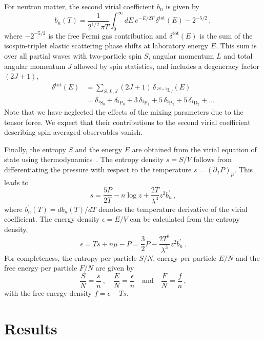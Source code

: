 \documentclass[aps,prc,twocolumn,showpacs,showkeys,amsmath,amssymb]{revtex4}
\newcommand{\be}{\begin{equation}}
\newcommand{\ee}{\end{equation}}
\begin{document}
For neutron matter, the second virial coefficient $b_n$ is given by
\begin{equation}
b_n(T)=\frac{1}{2^{1/2}\,\pi T} \int_0^\infty dE \: e^{-E/2T} \, 
\delta^{\text{tot}}(E) - 2^{-5/2} \,,
\label{bn}
\end{equation}
where $-2^{-5/2}$ is the free Fermi gas contribution and $\delta^{
\text{tot}}(E)$ is the sum of the isospin-triplet elastic scattering
phase shifts at laboratory energy $E$. This sum is over all partial waves
with two-particle spin $S$, angular momentum $L$ and total angular
momentum $J$ allowed by spin statistics, and includes a degeneracy 
factor $(2J+1)$,
\begin{align}
\delta^{\text{tot}}(E) &= \sum_{S,L,J} (2J+1) \, 
\delta_{\,^{2S+1}\text{L}_J}(E)
\nonumber \\[1mm]
&=\delta_{^1\text{S}_0}+\delta_{^3\text{P}_0}+3\,\delta_{^3\text{P}_1}
+5\,\delta_{^3\text{P}_2}+5\,\delta_{^1\text{D}_2}+ \ldots
\label{deltantot}
\end{align}
Note that we have neglected the effects of the mixing parameters due to 
the tensor force. We expect that their contributions to the second virial 
coefficient describing spin-averaged observables vanish.

Finally, the entropy $S$ and the energy $E$ are obtained from the virial 
equation of state using thermodynamics~\cite{Ho1,huang}. 
The entropy density $s=S/V$ follows from differentiating the pressure
with respect to the temperature $s=(\partial_T P)_{\mu}$. This leads to
\be
s = \frac{5P}{2T} - n \log z + \frac{2T}{\lambda^3} z^2 b_n^\prime \,,
\label{s}
\ee
where $b_n^\prime(T)=db_n(T)/dT$ denotes the temperature derivative of the 
virial coefficient. The energy density $\epsilon=E/V$ can be calculated from
the entropy density,
\be
\epsilon=T s + n \mu - P \nonumber
=\frac{3}{2}P - \frac{2T^2}{\lambda^3} z^2 b_n^\prime \,.
\label{epsilon}
\ee
For completeness, the entropy per particle $S/N$, energy per particle 
$E/N$ and the free energy per particle $F/N$ are given by
\begin{equation}
\frac{S}{N} = \frac{s}{n} \: , \quad
\frac{E}{N} = \frac{\epsilon}{n} \quad \text{and} \quad
\frac{F}{N} = \frac{f}{n} \,,
\label{esfa}
\end{equation}
with the free energy density $f=\epsilon - T s$.

\section{Results}
\label{results}
\end{document}

